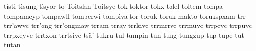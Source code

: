 \documentclass[a4paper]{article}
\begin{document}
tìsti\hspace{2mm}
tìsung\hspace{2mm}
tìsyor\hspace{2mm}
to\hspace{2mm}
Toitslan\hspace{2mm}
Toitsye\hspace{2mm}
tok\hspace{2mm}
toktor\hspace{2mm}
tokx\hspace{2mm}
tolel\hspace{2mm}
toltem\hspace{2mm}
tompa\hspace{2mm}
tompameyp\hspace{2mm}
tompawll\hspace{2mm}
tomperwì\hspace{2mm}
tompìva\hspace{2mm}
tor\hspace{2mm}
toruk\hspace{2mm}
toruk makto\hspace{2mm}
torukspxam\hspace{2mm}
trr\hspace{2mm}
trr'awve\hspace{2mm}
trr'ong\hspace{2mm}
trr'ongmaw\hspace{2mm}
trram\hspace{2mm}
trray\hspace{2mm}
trrkive\hspace{2mm}
trrmrrve\hspace{2mm}
trrmuve\hspace{2mm}
trrpeve\hspace{2mm}
trrpuve\hspace{2mm}
trrpxeyve\hspace{2mm}
trrtxon\hspace{2mm}
trrtsìve\hspace{2mm}
tsä'\hspace{2mm}
tukru\hspace{2mm}
tul\hspace{2mm}
tumpin\hspace{2mm}
tun\hspace{2mm}
tung\hspace{2mm}
tungzup\hspace{2mm}
tup\hspace{2mm}
tupe\hspace{2mm}
tut\hspace{2mm}
tutan\hspace{2mm}
\end{document}
